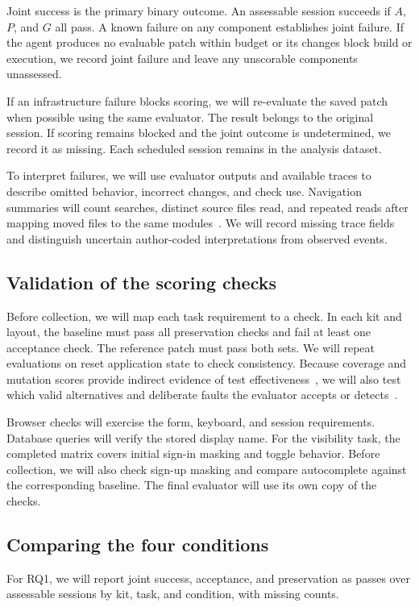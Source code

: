 \documentclass[11pt,a4paper]{article}
\begin{document}
Joint success is the primary binary outcome. An assessable session succeeds if $A$, $P$, and $G$ all pass. A known failure on any component establishes joint failure. If the agent produces no evaluable patch within budget or its changes block build or execution, we record joint failure and leave any unscorable components unassessed.

If an infrastructure failure blocks scoring, we will re-evaluate the saved patch when possible using the same evaluator. The result belongs to the original session. If scoring remains blocked and the joint outcome is undetermined, we record it as missing. Each scheduled session remains in the analysis dataset.

To interpret failures, we will use evaluator outputs and available traces to describe omitted behavior, incorrect changes, and check use. Navigation summaries will count searches, distinct source files read, and repeated reads after mapping moved files to the same modules~\cite{trivedi2026cleanliness}. We will record missing trace fields and distinguish uncertain author-coded interpretations from observed events.

\subsection{Validation of the scoring checks}
Before collection, we will map each task requirement to a check. In each kit and layout, the baseline must pass all preservation checks and fail at least one acceptance check. The reference patch must pass both sets. We will repeat evaluations on reset application state to check consistency. Because coverage and mutation scores provide indirect evidence of test effectiveness~\cite{inozemtseva2014coverage,just2014mutants,zhao2026coverage}, we will also test which valid alternatives and deliberate faults the evaluator accepts or detects~\cite{barr2015oracle,liu2023evalplus}.

Browser checks will exercise the form, keyboard, and session requirements. Database queries will verify the stored display name. For the visibility task, the completed matrix covers initial sign-in masking and toggle behavior. Before collection, we will also check sign-up masking and compare autocomplete against the corresponding baseline. The final evaluator will use its own copy of the checks.

\subsection{Comparing the four conditions}\label{sec:contrasts}
For RQ1, we will report joint success, acceptance, and preservation as passes over assessable sessions by kit, task, and condition, with missing counts.
\end{document}
